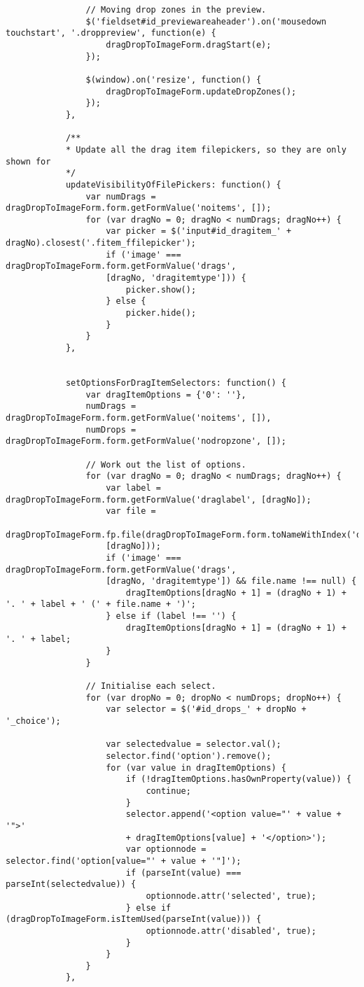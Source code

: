 \begin{lstlisting}
				// Moving drop zones in the preview.
				$('fieldset#id_previewareaheader').on('mousedown touchstart', '.droppreview', function(e) {
					dragDropToImageForm.dragStart(e);
				});
				
				$(window).on('resize', function() {
					dragDropToImageForm.updateDropZones();
				});
			},
			
			/**
			* Update all the drag item filepickers, so they are only shown for
			*/
			updateVisibilityOfFilePickers: function() {
				var numDrags = dragDropToImageForm.form.getFormValue('noitems', []);
				for (var dragNo = 0; dragNo < numDrags; dragNo++) {
					var picker = $('input#id_dragitem_' + dragNo).closest('.fitem_ffilepicker');
					if ('image' === dragDropToImageForm.form.getFormValue('drags',
					[dragNo, 'dragitemtype'])) {
						picker.show();
					} else {
						picker.hide();
					}
				}
			},
			
			
			setOptionsForDragItemSelectors: function() {
				var dragItemOptions = {'0': ''},
				numDrags = dragDropToImageForm.form.getFormValue('noitems', []),
				numDrops = dragDropToImageForm.form.getFormValue('nodropzone', []);
				
				// Work out the list of options.
				for (var dragNo = 0; dragNo < numDrags; dragNo++) {
					var label = dragDropToImageForm.form.getFormValue('draglabel', [dragNo]);
					var file =
					dragDropToImageForm.fp.file(dragDropToImageForm.form.toNameWithIndex('dragitem',
					[dragNo]));
					if ('image' === dragDropToImageForm.form.getFormValue('drags',
					[dragNo, 'dragitemtype']) && file.name !== null) {
						dragItemOptions[dragNo + 1] = (dragNo + 1) + '. ' + label + ' (' + file.name + ')';
					} else if (label !== '') {
						dragItemOptions[dragNo + 1] = (dragNo + 1) + '. ' + label;
					}
				}
				
				// Initialise each select.
				for (var dropNo = 0; dropNo < numDrops; dropNo++) {
					var selector = $('#id_drops_' + dropNo + '_choice');
					
					var selectedvalue = selector.val();
					selector.find('option').remove();
					for (var value in dragItemOptions) {
						if (!dragItemOptions.hasOwnProperty(value)) {
							continue;
						}
						selector.append('<option value="' + value + '">'
						+ dragItemOptions[value] + '</option>');
						var optionnode = selector.find('option[value="' + value + '"]');
						if (parseInt(value) === parseInt(selectedvalue)) {
							optionnode.attr('selected', true);
						} else if (dragDropToImageForm.isItemUsed(parseInt(value))) {
							optionnode.attr('disabled', true);
						}
					}
				}
			},
			

\end{lstlisting}

